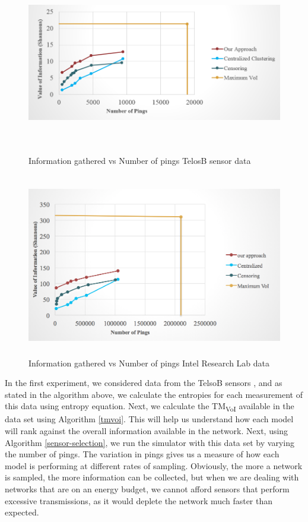 \begin{figure}
\begin{center}
\includegraphics[height = 80mm, width = 120mm, scale = 2]{figs/Result1}
\caption{Information gathered vs Number of pings \textemdash TelosB sensor data}
\label{telosb}
\end{center}
\end{figure}
\begin{figure}
\begin{center}
\includegraphics[height = 80mm, width = 120mm, scale = 2]{figs/Result2}
\caption{Information gathered vs Number of pings \textemdash Intel Research Lab data}
\label{intel}
\end{center}
\end{figure}
In the first experiment, we considered data from the TelsoB sensors
\cite{suthaharan2010labelled}, and as stated in the algorithm above,
we calculate the entropies for each measurement of this data using
entropy equation. Next, we calculate the TM\textsubscript {VoI}
available in the data set using Algorithm \ref{tmvoi}. This will help
us understand how each model will rank against the overall information
available in the network. Next, using Algorithm
\ref{sensor-selection}, we run the simulator with this data set by
varying the number of pings. The variation in pings gives us a measure
of how each model is performing at different rates of sampling.
Obviously, the more a network is sampled, the more information can be
collected, but when we are dealing with networks that are on an energy
budget, we cannot afford sensors that perform excessive transmissions,
as it would deplete the network much faster than expected.

